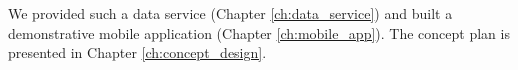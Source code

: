 \par We provided such a data service (Chapter \ref{ch:data_service}) and built a demonstrative mobile application (Chapter \ref{ch:mobile_app}). The concept plan is presented in Chapter \ref{ch:concept_design}.








